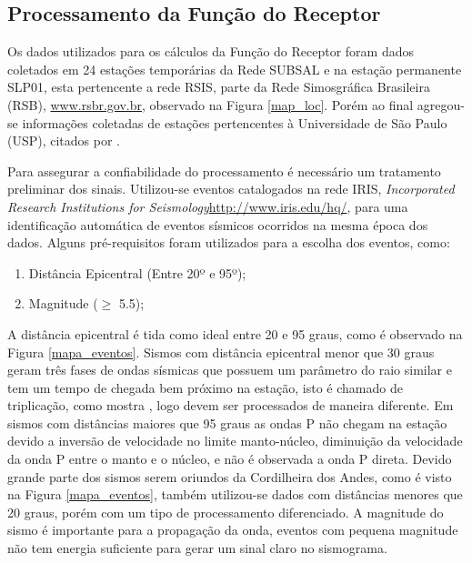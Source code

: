 \clearpage
\subsection{Processamento da Função do Receptor}

Os dados utilizados para os cálculos da Função do Receptor foram dados coletados em 24 estações temporárias da Rede SUBSAL e na estação permanente SLP01, esta pertencente a rede RSIS, parte da Rede Simosgráfica Brasileira (RSB), \url{www.rsbr.gov.br}, observado na Figura \ref{map_loc}. Porém ao final agregou-se informações coletadas de estações pertencentes à Universidade de São Paulo (USP), citados por \cite{Assumpcao_Brazil_2013}. 

Para assegurar a confiabilidade do processamento é necessário um tratamento preliminar dos sinais. Utilizou-se eventos catalogados na rede IRIS, \textit{Incorporated Research Institutions for Seismology}\url{http://www.iris.edu/hq/}, para uma identificação automática de eventos sísmicos ocorridos na mesma época dos dados. Alguns pré-requisitos foram utilizados para a escolha dos eventos, como:

\begin{enumerate}
\item Distância Epicentral (Entre 20º e 95º);
\item Magnitude ($\geq$ 5.5);
\end{enumerate}

A distância epicentral é tida como ideal entre 20 e 95 graus, como é observado na Figura \ref{mapa_eventos}. Sismos com distância epicentral menor que 30 graus geram três fases de ondas sísmicas que possuem um parâmetro do raio similar e tem um tempo de chegada bem próximo na estação, isto é chamado de triplicação, como mostra \cite{stahler_triplicated_2012}, logo devem ser processados de maneira diferente. Em sismos com distâncias maiores que 95 graus as ondas P não chegam na estação devido a inversão de velocidade no limite manto-núcleo, diminuição da velocidade da onda P entre o manto e o núcleo, e não é observada a onda P direta. Devido grande parte dos sismos serem oriundos da Cordilheira dos Andes, como é visto na Figura \ref{mapa_eventos}, também utilizou-se dados com distâncias menores que 20 graus, porém com um tipo de processamento diferenciado. A magnitude do sismo é importante para a propagação da onda, eventos com pequena magnitude não tem energia suficiente para gerar um sinal claro no sismograma.

